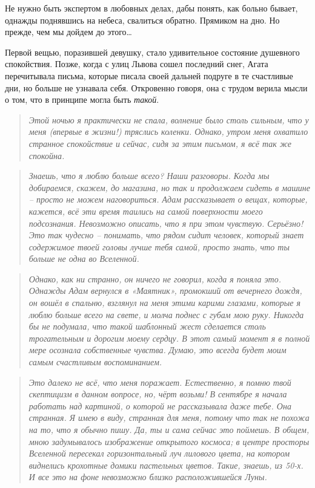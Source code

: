 \documentclass[
  a5paperpaper,
  DIV=11,
  numbers=noendperiod]{scrreprt}
\begin{document}
Не нужно быть экспертом в любовных делах, дабы понять, как больно
бывает, однажды поднявшись на небеса, свалиться обратно. Прямиком на
дно. Но прежде, чем мы дойдем до этого\ldots{}

Первой вещью, поразившей девушку, стало удивительное состояние душевного
спокойствия. Позже, когда с улиц Львова сошел последний снег, Агата
перечитывала письма, которые писала своей дальней подруге в те
счастливые дни, но больше не узнавала себя. Откровенно говоря, она с
трудом верила мысли о том, что в принципе могла быть \emph{такой}.

\begin{quote}
\emph{Этой ночью я практически не спала, волнение было столь сильным,
что у меня (впервые в жизни!) тряслись коленки. Однако, утром меня
охватило странное спокойствие и сейчас, сидя за этим письмом, я всё так
же спокойна.}
\end{quote}

\begin{quote}
\emph{Знаешь, что я люблю больше всего? Наши разговоры. Когда мы
добираемся, скажем, до магазина, но так и продолжаем сидеть в машине --
просто не можем наговориться. Адам рассказывает о вещах, которые,
кажется, всё эти время таились на самой поверхности моего подсознания.
Невозможно описать, что я при этом чувствую. Серьёзно! Это так чудесно
-- понимать, что рядом сидит человек, который знает содержимое твоей
головы лучше тебя самой, просто знать, что ты больше не одна во
Вселенной.}
\end{quote}

\begin{quote}
\emph{Однако, как ни странно, он ничего не говорил, когда я поняла это.
Однажды Адам вернулся в «Маятник», промокший от вечернего дождя, он
вошёл в спальню, взглянул на меня этими карими глазами, которые я люблю
больше всего на свете, и молча поднес с губам мою руку. Никогда бы не
подумала, что такой шаблонный жест сделается столь трогательным и
дорогим моему сердцу. В этот самый момент я в полной мере осознала
собственные чувства. Думаю, это всегда будет моим самым счастливым
воспоминанием. }
\end{quote}

\begin{quote}
\emph{Это далеко не всё, что меня поражает. Естественно, я помню твой
скептицизм в данном вопросе, но, чёрт возьми! В сентябре я начала
работать над картиной, о которой не рассказывала даже тебе. Она
странная. Я имею в виду, странная для меня, потому что так не похожа на
то, что я обычно пишу. Да, ты и сама сейчас это поймешь. В общем, мною
задумывалось изображение открытого космоса; в центре просторы Вселенной
пересекал горизонтальный луч лилового цвета, на котором виднелись
крохотные домики пастельных цветов. Такие, знаешь, из 50-х. И все это на
фоне невозможно близко расположившейся Луны.}
\end{quote}
\end{document}
